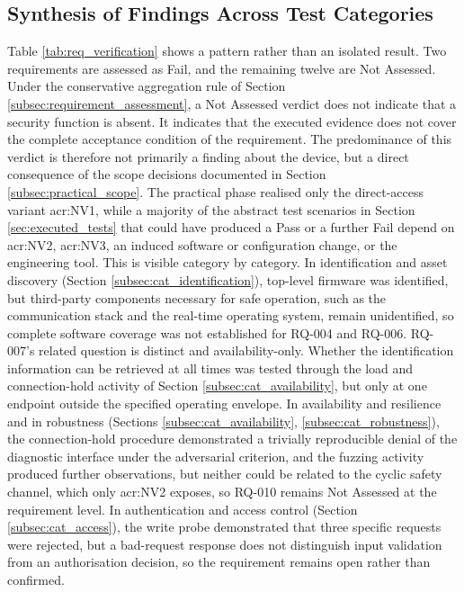 \subsection{Synthesis of Findings Across Test Categories}
\label{subsec:discussion_synthesis} 
Table \ref{tab:req_verification} shows a pattern rather than an isolated result. Two requirements are assessed as Fail, and the remaining twelve are Not Assessed. Under the conservative aggregation rule of Section \ref{subsec:requirement_assessment}, a Not Assessed verdict does not indicate that a security function is absent. It indicates that the executed evidence does not cover the complete acceptance condition of the requirement. The predominance of this verdict is therefore not primarily a finding about the device, but a direct consequence of the scope decisions documented in Section \ref{subsec:practical_scope}. The practical phase realised only the direct-access variant \gls{acr:NV1}, while a majority of the abstract test scenarios in Section \ref{sec:executed_tests} that could have produced a Pass or a further Fail depend on \gls{acr:NV2}, \gls{acr:NV3}, an induced software or configuration change, or the engineering tool. This is visible category by category. In identification and asset discovery (Section \ref{subsec:cat_identification}), top-level firmware was identified, but third-party components necessary for safe operation, such as the communication stack and the real-time operating system, remain unidentified, so complete software coverage was not established for RQ-004 and RQ-006. RQ-007's related question is distinct and availability-only. Whether the identification information can be retrieved at all times was tested through the load and connection-hold activity of Section \ref{subsec:cat_availability}, but only at one endpoint outside the specified operating envelope. In availability and resilience and in robustness (Sections \ref{subsec:cat_availability}, \ref{subsec:cat_robustness}), the connection-hold procedure demonstrated a trivially reproducible denial of the diagnostic interface under the adversarial criterion, and the fuzzing activity produced further observations, but neither could be related to the cyclic safety channel, which only \gls{acr:NV2} exposes, so RQ-010 remains Not Assessed at the requirement level. In authentication and access control (Section \ref{subsec:cat_access}), the write probe demonstrated that three specific requests were rejected, but a bad-request response does not distinguish input validation from an authorisation decision, so the requirement remains open rather than confirmed.

